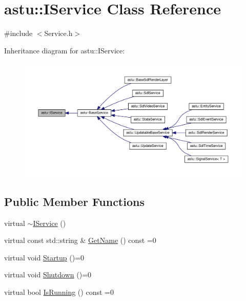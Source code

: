 \hypertarget{classastu_1_1IService}{}\section{astu\+:\+:I\+Service Class Reference}
\label{classastu_1_1IService}


{\ttfamily \#include $<$Service.\+h$>$}



Inheritance diagram for astu\+:\+:I\+Service\+:\nopagebreak
\begin{figure}[H]
\begin{center}
\leavevmode
\includegraphics[width=350pt]{classastu_1_1IService__inherit__graph}
\end{center}
\end{figure}
\subsection*{Public Member Functions}
\begin{DoxyCompactItemize}
\item 
virtual \hyperlink{classastu_1_1IService_abf42fedf905da617ad881d3fd28a9d7e}{$\sim$\+I\+Service} ()
\item 
virtual const std\+::string \& \hyperlink{classastu_1_1IService_a7bfb508c07816c701ceaa72928213380}{Get\+Name} () const =0
\item 
virtual void \hyperlink{classastu_1_1IService_a7a09e485d116659f174aca9a8494fa55}{Startup} ()=0
\item 
virtual void \hyperlink{classastu_1_1IService_a67643385e7cc17c31e0b3b49672b5856}{Shutdown} ()=0
\item 
virtual bool \hyperlink{classastu_1_1IService_ab69225f6a613c8829c45d23158fba775}{Is\+Running} () const =0
\end{DoxyCompactItemize}


